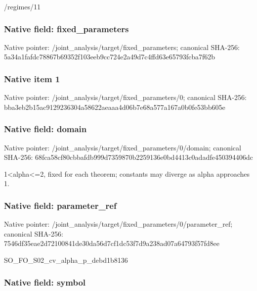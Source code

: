 \documentclass[10pt,a4paper]{article}
\begin{document}
/regimes/11


\subsubsection{Native field: fixed\_parameters}


Native pointer: /joint\_analysis/target/fixed\_parameters; canonical SHA-256: 5a34a1fafdc78867b69352f1\allowbreak{}03eeb9cc724e2a49d7c4ffd6\allowbreak{}3e65793fcba7f62b



\subsubsection{Native item 1}


Native pointer: /joint\_analysis/target/f\allowbreak{}ixed\_parameters/0; canonical SHA-256: bba3eb2b15ac9129236304a5\allowbreak{}8622aeaaa4d06b7e68a577a1\allowbreak{}67a0b0fe53bb605e



\subsubsection{Native field: domain}


Native pointer: /joint\_analysis/target/f\allowbreak{}ixed\_parameters/0/domain; canonical SHA-256: 68fca58cf80cbbafdb999d73\allowbreak{}59870b2259136e0bd4413c0a\allowbreak{}dadfe450394406dc


1<alpha<=2, fixed for each theorem; constants may diverge as alpha approaches 1.


\subsubsection{Native field: parameter\_ref}


Native pointer: /joint\_analysis/target/f\allowbreak{}ixed\_parameters/0/parame\allowbreak{}ter\_ref; canonical SHA-256: 7546df35eae2d72100841de3\allowbreak{}0da56d7cf1dc53f7d9a238ad\allowbreak{}07a64793f57fd8ee


SO\_FO\_S02\_cv\_alpha\_p\_debd1b8136


\subsubsection{Native field: symbol}
\end{document}
